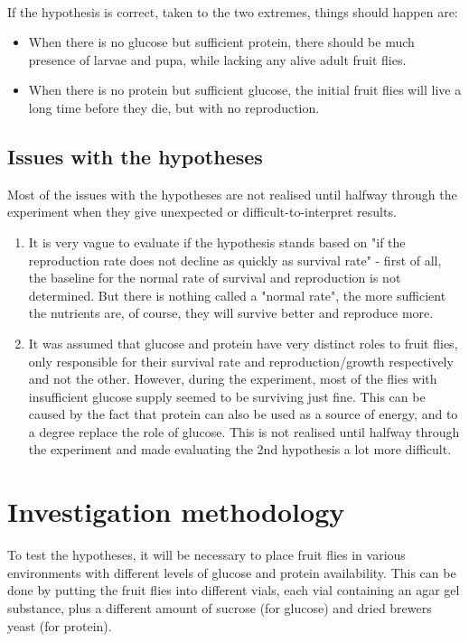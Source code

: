 \documentclass{article}
\begin{document}
\noindent\\
If the hypothesis is correct, taken to the two extremes, things should happen are:

\begin{itemize}
    \item When there is no glucose but sufficient protein, there should be much presence of larvae and pupa, while lacking any alive adult fruit flies.
    \item When there is no protein but sufficient glucose, the initial fruit flies will live a long time before they die, but with no reproduction.
\end{itemize}

\subsection{Issues with the hypotheses}

Most of the issues with the hypotheses are not realised until halfway through the experiment when they give unexpected or difficult-to-interpret results.

\begin{enumerate}
    \item It is very vague to evaluate if the hypothesis stands based on "if the reproduction rate does not decline as quickly as survival rate" - first of all, the baseline for the normal rate of survival and reproduction is not determined. But there is nothing called a "normal rate", the more sufficient the nutrients are, of course, they will survive better and reproduce more.
    \item It was assumed that glucose and protein have very distinct roles to fruit flies, only responsible for their survival rate and reproduction/growth respectively and not the other. However, during the experiment, most of the flies with insufficient glucose supply seemed to be surviving just fine. This can be caused by the fact that protein can also be used as a source of energy, and to a degree replace the role of glucose. This is not realised until halfway through the experiment and made evaluating the 2nd hypothesis a lot more difficult.
\end{enumerate}

\newpage
\section{Investigation methodology}

To test the hypotheses, it will be necessary to place fruit flies in various environments with different levels of glucose and protein availability. This can be done by putting the fruit flies into different vials, each vial containing an agar gel substance, plus a different amount of sucrose (for glucose) and dried brewers yeast (for protein).
\end{document}
